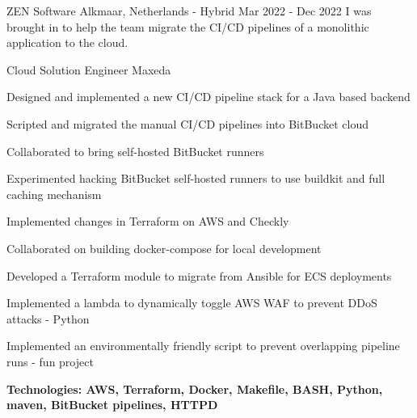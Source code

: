 \begin{cventries}
{ZEN Software}
{Alkmaar, Netherlands - Hybrid}
{Mar 2022 - Dec 2022}
{I was brought in to help the team migrate the CI/CD pipelines of a monolithic application to the cloud.}
\hfill\begin{minipage}{\dimexpr\textwidth-1cm}
\xdef\tpd{\the\prevdepth}
\begin{cventrystack}
	\cventry
	{Cloud Solution Engineer} %
	{Maxeda} %
	{}
	{}
	{
		\begin{cvitems}
			\item {Designed and implemented a new CI/CD pipeline stack for a Java based backend}
			\item {Scripted and migrated the manual CI/CD pipelines into BitBucket cloud}
			\item {Collaborated to bring self-hosted BitBucket runners}
			\item {Experimented hacking BitBucket self-hosted runners to use buildkit and full caching mechanism}
			\item {Implemented changes in Terraform on AWS and Checkly}
			\item {Collaborated on building docker-compose for local development}
			\item {Developed a Terraform module to migrate from Ansible for ECS deployments}
			\item {Implemented a lambda to dynamically toggle AWS WAF to prevent DDoS attacks - Python}
			\item {Implemented an environmentally friendly script to prevent overlapping pipeline runs - fun project}
			\item {\bfseries{Technologies:} AWS, Terraform, Docker, Makefile, BASH, Python, maven, BitBucket pipelines, HTTPD}
		\end{cvitems}
	}
\end{cventrystack}
\end{minipage}


\end{cventries}
